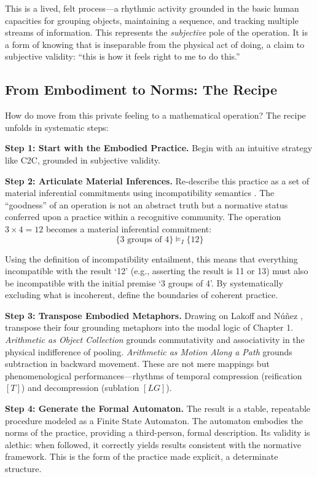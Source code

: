 \documentclass[12pt]{book}
\begin{document}
This is a lived, felt process---a rhythmic activity grounded in the basic human capacities for grouping objects, maintaining a sequence, and tracking multiple streams of information. This represents the \textit{subjective} pole of the operation. It is a form of knowing that is inseparable from the physical act of doing, a claim to subjective validity: \enquote{this is how it feels right to me to do this.}

\subsection*{From Embodiment to Norms: The Recipe}

How do  move from this private feeling to a mathematical operation? The recipe unfolds in systematic steps:

\textbf{Step 1: Start with the Embodied Practice.} Begin with an intuitive strategy like C2C, grounded in subjective validity.

\textbf{Step 2: Articulate Material Inferences.} Re-describe this practice as a set of material inferential commitments using incompatibility semantics \parencite{Brandom2008}. The \enquote{goodness} of an operation is not an abstract truth but a normative status conferred upon a practice within a recognitive community. The operation $3 \times 4 = 12$ becomes a material inferential commitment:
\[
\{ \text{3 groups of 4} \} \vDash_{I} \{ 12 \}
\]

Using the definition of incompatibility entailment, this means that everything incompatible with the result `12' (e.g., asserting the result is 11 or 13) must also be incompatible with the initial premise `3 groups of 4'. By systematically excluding what is incoherent,  define the boundaries of coherent practice.

\textbf{Step 3: Transpose Embodied Metaphors.} Drawing on Lakoff and Núñez \parencite{Lakoff2000}, transpose their four grounding metaphors into the modal logic of Chapter 1. \textit{Arithmetic as Object Collection} grounds commutativity and associativity in the physical indifference of pooling. \textit{Arithmetic as Motion Along a Path} grounds subtraction in backward movement. These are not mere mappings but phenomenological performances---rhythms of temporal compression (reification $[T]$) and decompression (sublation $[LG]$).

\textbf{Step 4: Generate the Formal Automaton.} The result is a stable, repeatable procedure modeled as a Finite State Automaton. The automaton embodies the norms of the practice, providing a third-person, formal description. Its validity is alethic: when followed, it correctly yields results consistent with the normative framework. This is the form of the practice made explicit, a determinate structure.
\end{document}
